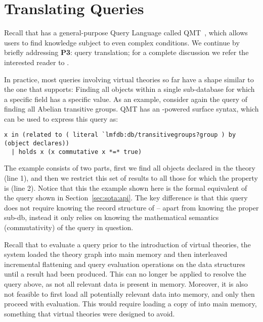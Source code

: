 \section{Translating Queries}\label{sec:qmt}

Recall that \mmt has a general-purpose Query Language called QMT~\cite{Rabe:qlfml12}, which allows users to find knowledge subject to even complex conditions. 
We continue by briefly addressing \textbf{P3}: query translation; for a complete discussion we refer the interested reader to \cite{twiesing:msc17}. 

In practice, most queries involving virtual theories so far have a shape similar to the one that \lmfdb supports: 
Finding all objects within a single sub-database for which a specific field has a specific value. 
As an example, consider again the query of finding all Abelian transitive groups. 
QMT has an \mmt-powered surface syntax, which can be used to express this query as:
\begin{lstlisting}[language=qmt,basicstyle=\small\sf]
x in (related to ( literal `lmfdb:db/transitivegroups?group ) by (object declares)) 
  | holds x (x commutative x *=* true)
\end{lstlisting}

The example consists of two parts, first we find all objects declared in the  theory (line 1), and then we restrict this set of results to all those for which the  property is  (line 2). 
Notice that this the example shown here is the formal equivalent of the \lmfdb query shown in Section~\ref{sec:sota:api}. 
The key difference is that this query does not require knowing the record structure of \lmfdb --
apart from knowing the proper sub-db, instead it only relies on knowing the mathematical
semantics (commutativity) of the query in question. 

Recall that to evaluate a query prior to the introduction of virtual theories, the \mmt system loaded the theory graph into main memory and then interleaved incremental flattening and query evaluation operations on the \mmt data structures until a result had been produced. 
This can no longer be applied to resolve the query above, as not all relevant data is present in memory. 
Moreover, it is also not feasible to first load all potentially relevant data into memory, and only then proceed with evaluation. 
This would require loading a copy of \lmfdb into main memory, something that virtual theories were designed to avoid. 

